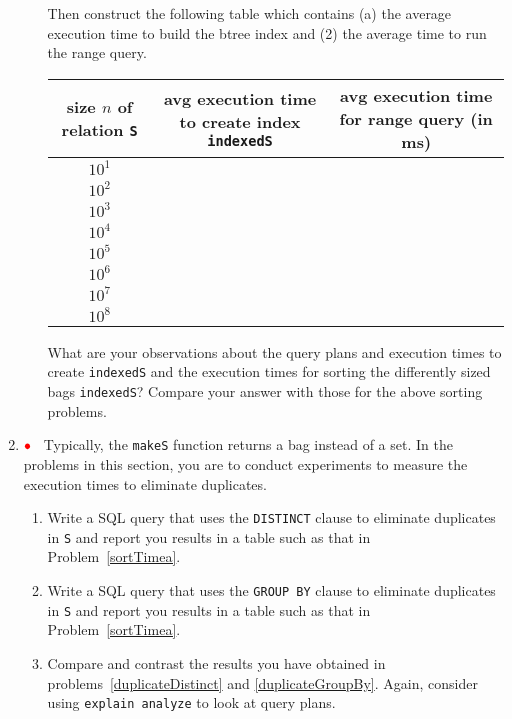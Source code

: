 \documentclass{article}
\newcommand{\redbullet}{$\textcolor{red}{\bullet}$}
\newcommand{\blue}[1]{{\color{blue}#1}}
\begin{document}
\begin{enumerate}[resume]
\begin{enumerate}
Then construct the following table which contains (a) the average execution time to build the btree index
and (2) the average time to run the range query.
\begin{center}
{\footnotesize
\begin{tabular}{c|c|c}
size $n$ of relation {\tt S} & avg execution time to create index {\tt indexedS} & avg execution time for range query (in ms) \\ \hline
$10^1$ & &\\
$10^2$ & &\\
$10^3$ &  &\\
$10^4$ & &\\
$10^5$ &  &\\
$10^6$ &  &\\
$10^7$ & &\\
$10^8$ & &\\
\end{tabular}
}
\end{center}
What are your observations about the query plans and execution times to create  {\tt indexedS} and the execution times for sorting the differently sized bags {\tt indexedS}?   Compare your answer with those for the above sorting problems.
\end{enumerate}

\item \redbullet\ %
Typically, the {\tt makeS} function returns a bag instead of a set.   In the problems in this section, you are to conduct
experiments to measure the execution times to eliminate duplicates.   

\begin{enumerate}
\item\label{duplicateDistinct} 
Write a SQL query that uses the \blue{\tt DISTINCT} clause to eliminate duplicates in {\tt S} and 
report you results in a table such as that in Problem~\ref{sortTimea}.
\item\label{duplicateGroupBy}  Write a SQL query that uses the \blue{\tt GROUP BY} clause to eliminate duplicates in {\tt S} and 
report you results in a table such as that in Problem~\ref{sortTimea}.
\item Compare and contrast the results you have obtained in problems~\ref{duplicateDistinct} and \ref{duplicateGroupBy}.
Again, consider using \blue{\tt explain analyze} to look at query plans.

\end{enumerate}

\end{enumerate}
\end{document}

